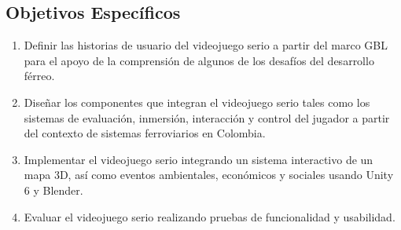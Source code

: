 \subsection{Objetivos Específicos}
\begin{enumerate}[label=\arabic*.]
  \item Definir las historias de usuario del videojuego serio a partir del marco GBL para el apoyo de la comprensión de algunos de los desafíos del desarrollo férreo.
  \item Diseñar los componentes que integran el videojuego serio tales como los sistemas de evaluación, inmersión, interacción y control del jugador a partir del contexto de sistemas ferroviarios en Colombia.
  \item Implementar el videojuego serio integrando un sistema interactivo de un mapa 3D, así como eventos ambientales, económicos y sociales usando Unity 6 y Blender.
  \item Evaluar el videojuego serio realizando pruebas de funcionalidad y usabilidad.
\end{enumerate}
